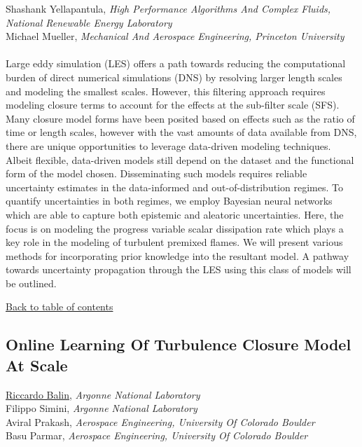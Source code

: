 {Shashank Yellapantula}, \textit{High Performance Algorithms And Complex Fluids, National Renewable Energy Laboratory}\\ 
{Michael Mueller}, \textit{Mechanical And Aerospace Engineering, Princeton University}\\ 
\vspace{-0.1 in} \\ 
\noindent Large eddy simulation (LES) offers a path towards reducing the computational burden of direct numerical simulations (DNS) by resolving larger length scales and modeling the smallest scales. However, this filtering approach requires modeling closure terms to account for the effects at the sub-filter scale (SFS). Many closure model forms have been posited based on effects such as the ratio of time or length scales, however with the vast amounts of data available from DNS, there are unique opportunities to leverage data-driven modeling techniques. Albeit flexible, data-driven models still depend on the dataset and the functional form of the model chosen. Disseminating such models requires reliable uncertainty estimates in the data-informed and out-of-distribution regimes. To quantify uncertainties in both regimes, we employ Bayesian neural networks which are able to capture both epistemic and aleatoric uncertainties. Here, the focus is on modeling the progress variable scalar dissipation rate which plays a key role in the modeling of turbulent premixed flames. We will present various methods for incorporating prior knowledge into the resultant model. A pathway towards uncertainty propagation through the LES using this class of models will be outlined. \\ 
\begin{flushright}\vspace{-0.2 in}\hyperlink{toc}{Back to table of contents}\end{flushright}\vspace{-0.2 in}
\hypertarget{RiccardoBalin}{\subsection*{\color{CUGOLD} Online Learning Of Turbulence Closure Model At Scale}} \vsp 
\underline{Riccardo Balin}, \textit{Argonne National Laboratory}\\ 
{Filippo Simini}, \textit{Argonne National Laboratory}\\ 
{Aviral Prakash}, \textit{Aerospace Engineering, University Of Colorado Boulder}\\ 
{Basu Parmar}, \textit{Aerospace Engineering, University Of Colorado Boulder}\\ 
